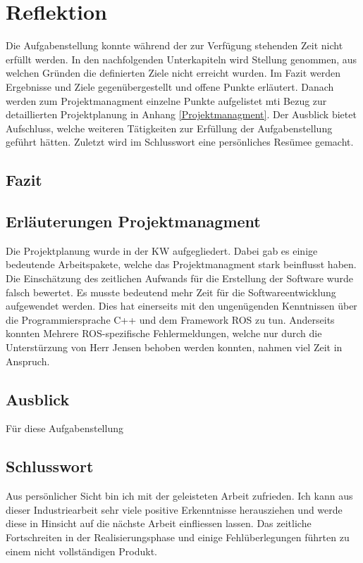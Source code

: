\chapter{Reflektion}
\label{chap:Reflektion}

Die Aufgabenstellung konnte während der zur Verfügung stehenden Zeit nicht erfüllt werden. In den nachfolgenden Unterkapiteln wird Stellung genommen, aus welchen Gründen die definierten Ziele nicht erreicht wurden. Im Fazit werden Ergebnisse und Ziele gegenübergestellt und offene Punkte erläutert. Danach werden zum Projektmanagment einzelne Punkte aufgelistet mti Bezug zur detaillierten Projektplanung in Anhang \ref{Projektmanagment}. Der Ausblick bietet Aufschluss, welche weiteren Tätigkeiten zur Erfüllung der Aufgabenstellung geführt hätten. Zuletzt wird im Schlusswort eine persönliches Resümee gemacht.
\section{Fazit}
\label{sec:}

\section{Erläuterungen Projektmanagment}
\label{sec: pm}

Die Projektplanung wurde in der KW  aufgegliedert. Dabei gab es einige bedeutende Arbeitspakete, welche das Projektmanagment stark beinflusst haben. Die Einschätzung des zeitlichen Aufwands für die Erstellung der Software wurde falsch bewertet. Es musste bedeutend mehr Zeit für die Softwareentwicklung aufgewendet werden. Dies hat einerseits mit den ungenügenden Kenntnissen über die Programmiersprache C++ und dem Framework ROS zu tun. Anderseits konnten  Mehrere ROS-spezifische Fehlermeldungen, welche nur durch die Unterstürzung von Herr Jensen behoben werden konnten, nahmen viel Zeit in Anspruch.


\section{Ausblick}
\label{sec: Ausblick}

Für diese Aufgabenstellung 

\section{Schlusswort}
Aus persönlicher Sicht bin ich mit der geleisteten Arbeit zufrieden. Ich kann aus dieser Industriearbeit sehr viele positive Erkenntnisse herausziehen und werde diese in Hinsicht auf die nächste Arbeit einfliessen lassen. Das zeitliche Fortschreiten in der Realisierungsphase und einige Fehlüberlegungen führten zu einem nicht vollständigen Produkt.  

